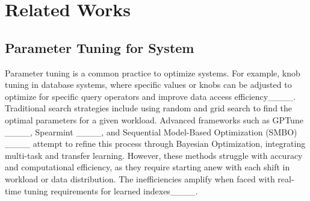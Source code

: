 \section{Related Works}
\label{sec:related_works}





\subsection{Parameter Tuning for System}
\label{sec:PT}
Parameter tuning is a common practice to optimize systems. For example, knob tuning in database systems, where specific values or knobs can be adjusted to optimize for specific query operators and improve data access efficiency____. Traditional search strategies include using random and grid search to find the optimal parameters for a given workload. Advanced frameworks such as GPTune ____, Spearmint ____, and Sequential Model-Based Optimization (SMBO) ____ attempt to refine this process through Bayesian Optimization, integrating multi-task and transfer learning. However, these methods struggle with accuracy and computational efficiency, as they require starting anew with each shift in workload or data distribution. The inefficiencies amplify when faced with real-time tuning requirements for learned indexes____.

